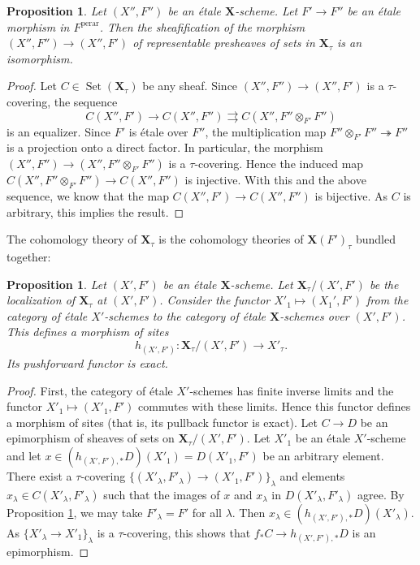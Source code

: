 \documentclass{amsart}
\newtheorem{Prop}[Thm]{Proposition}
\theoremstyle{remark}
\numberwithin{equation}{subsection}
\newcommand{\onto}{\twoheadrightarrow}
\newcommand{\tensor}{\mathbin{\otimes}}
\newcommand{\perar}{\mathrm{perar}}
\newcommand{\alg}[1]{\mathbf{#1}}
\DeclareMathOperator{\Set}{Set}
\begin{document}
\begin{Prop} \label{0030}
	Let $(X'', F'')$ be an \'etale $\alg{X}$-scheme.
	Let $F' \to F''$ be an \'etale morphism in $F^{\perar}$.
	Then the sheafification of the morphism $(X'', F'') \to (X'', F')$ of representable presheaves of sets
	in $\alg{X}_{\tau}$ is an isomorphism.
\end{Prop}

\begin{proof}
	Let $C \in \Set(\alg{X}_{\tau})$ be any sheaf.
	Since $(X'', F'') \to (X'', F')$ is a $\tau$-covering,
	the sequence
		\[
				C(X'', F')
			\to
				C(X'', F'')
			\rightrightarrows
				C(X'', F'' \tensor_{F'} F'')
		\]
	is an equalizer.
	Since $F'$ is \'etale over $F''$,
	the multiplication map $F'' \tensor_{F'} F'' \onto F''$ is a projection onto a direct factor.
	In particular, the morphism $(X'', F'') \to (X'', F'' \tensor_{F'} F'')$ is a $\tau$-covering.
	Hence the induced map
	$C(X'', F'' \tensor_{F'} F'') \to C(X'', F'')$ is injective.
	With this and the above sequence,
	we know that the map $C(X'', F') \to C(X'', F'')$ is bijective.
	As $C$ is arbitrary, this implies the result.
\end{proof}

The cohomology theory of $\alg{X}_{\tau}$ is the cohomology theories of $\alg{X}(F')_{\tau}$
bundled together:

\begin{Prop} \label{0031}
	Let $(X', F')$ be an \'etale $\alg{X}$-scheme.
	Let $\alg{X}_{\tau} / (X', F')$ be
	the localization of $\alg{X}_{\tau}$ at $(X', F')$.
	Consider the functor $X'_{1} \mapsto (X_{1}', F')$
	from the category of \'etale $X'$-schemes
	to the category of \'etale $\alg{X}$-schemes over $(X', F')$.
	This defines a morphism of sites
		\[
				h_{(X', F')}
			\colon
				\alg{X}_{\tau} / (X', F')
			\to
				X'_{\tau}.
		\]
	Its pushforward functor is exact.
\end{Prop}

\begin{proof}
	First, the category of \'etale $X'$-schemes has finite inverse limits
	and the functor $X'_{1} \mapsto (X'_{1}, F')$ commutes with these limits.
	Hence this functor defines a morphism of sites
	(that is, its pullback functor is exact).
	Let $C \to D$ be an epimorphism of sheaves of sets
	on $\alg{X}_{\tau} / (X', F')$.
	Let $X'_{1}$ be an \'etale $X'$-scheme
	and let $x \in (h_{(X', F'), \ast} D)(X'_{1}) = D(X'_{1}, F')$ be an arbitrary element.
	There exist a $\tau$-covering $\{(X'_{\lambda}, F'_{\lambda}) \to (X'_{1}, F')\}_{\lambda}$
	and elements $x_{\lambda} \in C(X'_{\lambda}, F'_{\lambda})$ such that
	the images of $x$ and $x_{\lambda}$ in $D(X'_{\lambda}, F'_{\lambda})$ agree.
	By Proposition \ref{0030},
	we may take $F'_{\lambda} = F'$ for all $\lambda$.
	Then $x_{\lambda} \in (h_{(X', F'), \ast} D)(X'_{\lambda})$.
	As $\{X'_{\lambda} \to X'_{1}\}_{\lambda}$ is a $\tau$-covering,
	this shows that $f_{\ast} C \to h_{(X', F'), \ast} D$ is an epimorphism.
\end{proof}
\end{document}
